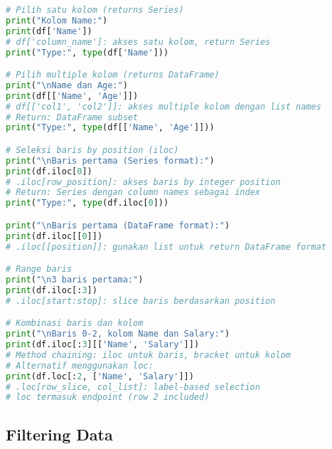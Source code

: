 \begin{lstlisting}[language=python, caption={Teknik Seleksi Baris dan Kolom}, style=python]
# Pilih satu kolom (returns Series)
print("Kolom Name:")
print(df['Name'])
# df['column_name']: akses satu kolom, return Series
print("Type:", type(df['Name']))

# Pilih multiple kolom (returns DataFrame)
print("\nName dan Age:")
print(df[['Name', 'Age']])
# df[['col1', 'col2']]: akses multiple kolom dengan list names
# Return: DataFrame subset
print("Type:", type(df[['Name', 'Age']]))

# Seleksi baris by position (iloc)
print("\nBaris pertama (Series format):")
print(df.iloc[0])
# .iloc[row_position]: akses baris by integer position
# Return: Series dengan column names sebagai index
print("Type:", type(df.iloc[0]))

print("\nBaris pertama (DataFrame format):")
print(df.iloc[[0]])
# .iloc[[position]]: gunakan list untuk return DataFrame format

# Range baris
print("\n3 baris pertama:")
print(df.iloc[:3])
# .iloc[start:stop]: slice baris berdasarkan position

# Kombinasi baris dan kolom
print("\nBaris 0-2, kolom Name dan Salary:")
print(df.iloc[:3][['Name', 'Salary']])
# Method chaining: iloc untuk baris, bracket untuk kolom
# Alternatif menggunakan loc:
print(df.loc[:2, ['Name', 'Salary']])
# .loc[row_slice, col_list]: label-based selection
# loc termasuk endpoint (row 2 included)
\end{lstlisting}

\subsection*{Filtering Data}

